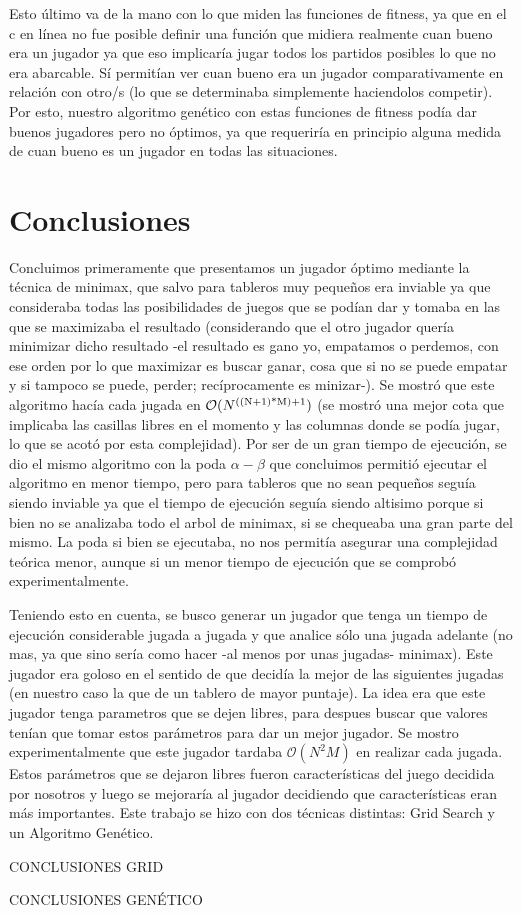 \documentclass[A4paper,oneside,fleqn,11pt]{article}
\theoremstyle{definition}
\begin{document}
Esto último va de la mano con lo que miden las funciones de fitness, ya que en el c en línea no fue posible definir una función que midiera realmente cuan bueno era un jugador ya que eso implicaría jugar todos los partidos posibles lo que no era abarcable. Sí permitían ver cuan bueno era un jugador comparativamente en relación con otro/s (lo que se determinaba simplemente haciendolos competir). Por esto, nuestro algoritmo genético con estas funciones de fitness podía dar buenos jugadores pero no óptimos, ya que requeriría en principio alguna medida de cuan bueno es un jugador en todas las situaciones.

\section{Conclusiones}

Concluimos primeramente que presentamos un jugador óptimo mediante la técnica de minimax, que salvo para tableros muy pequeños era inviable ya que consideraba todas las posibilidades de juegos que se podían dar y tomaba en las que se maximizaba el resultado (considerando que el otro jugador quería minimizar dicho resultado -el resultado es gano yo, empatamos o perdemos, con ese orden por lo que maximizar es buscar ganar, cosa que si no se puede empatar y si tampoco se puede, perder; recíprocamente es minizar-). Se mostró que este algoritmo hacía cada jugada en $\mathcal{O}(N\textsuperscript{((N+1)*M)+1})$ (se mostró una mejor cota que implicaba las casillas libres en el momento y las columnas donde se podía jugar, lo que se acotó por esta complejidad). Por ser de un gran tiempo de ejecución, se dio el mismo algoritmo con la poda $\alpha - \beta$ que concluimos permitió ejecutar el algoritmo en menor tiempo, pero para tableros que no sean pequeños seguía siendo inviable ya que el tiempo de ejecución seguía siendo altisimo porque si bien no se analizaba todo el arbol de minimax, si se chequeaba una gran parte del mismo. La poda si bien se ejecutaba, no nos permitía asegurar una complejidad teórica menor, aunque si un menor tiempo de ejecución que se comprobó experimentalmente.

Teniendo esto en cuenta, se busco generar un jugador que tenga un tiempo de ejecución considerable jugada a jugada y que analice sólo una jugada adelante (no mas, ya que sino sería como hacer -al menos por unas jugadas- minimax). Este jugador era goloso en el sentido de que decidía la mejor de las siguientes jugadas (en nuestro caso la que de un tablero de mayor puntaje). La idea era que este jugador tenga parametros que se dejen libres, para despues buscar que valores tenían que tomar estos parámetros para dar un mejor jugador. Se mostro experimentalmente que este jugador tardaba $\mathcal{O}(N^2M)$ en realizar cada jugada. Estos parámetros que se dejaron libres fueron características del juego decidida por nosotros y luego se mejoraría al jugador decidiendo que características eran más importantes. Este trabajo se hizo con dos técnicas distintas: Grid Search y un Algoritmo Genético.

CONCLUSIONES GRID

CONCLUSIONES GENÉTICO
\end{document}
